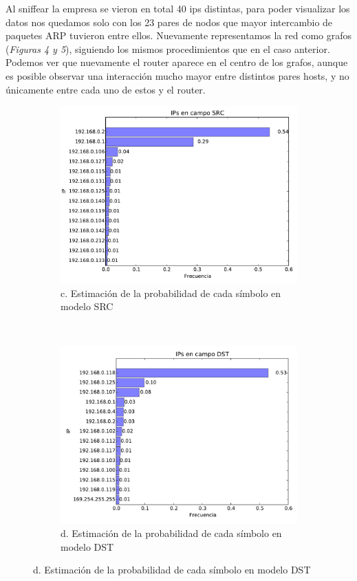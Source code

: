 Al sniffear la empresa se vieron en total 40 ips distintas, para poder
visualizar los datos nos quedamos solo con los 23 pares de nodos que 
mayor intercambio de paquetes ARP tuvieron entre ellos. 
Nuevamente representamos la red como grafos (\emph{Figuras 4 y 5}), 
siguiendo los mismos procedimientos que en el caso anterior. 
Podemos ver que nuevamente el router aparece en el centro de los grafos,
aunque es posible observar una interacción mucho mayor 
entre distintos pares hosts, y no únicamente entre cada uno de estos y el
router.

\begin{figure}[H]
	\center
	\begin{subfigure}{0.43\textwidth}
		\includegraphics[width=1.0\textwidth]{resultados/empresa/ipsSrc_2_05542931604.pdf}
		\caption{c. Estimaci\'on de la probabilidad de cada s\'imbolo en modelo SRC}
	\end{subfigure}
	~
	\begin{subfigure}{0.43\textwidth}
		\includegraphics[width=1.0\textwidth]{resultados/empresa/ipsDst_2_99926622579.pdf}
		\caption{d. Estimaci\'on de la probabilidad de cada s\'imbolo en modelo DST}
	\end{subfigure}
\end{figure}

